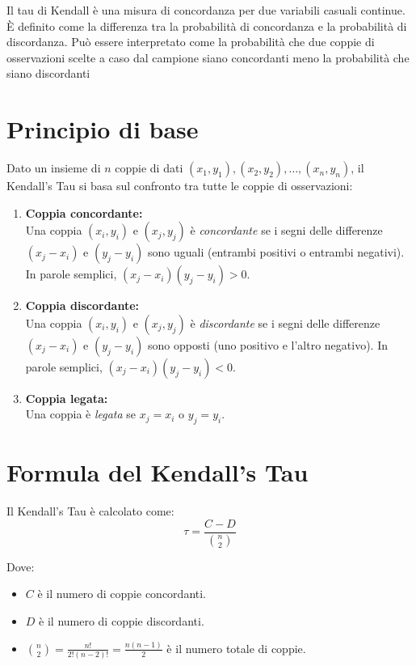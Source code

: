 \documentclass[a4paper,12pt]{article}
\begin{document}
\begin{itemize}
	Il tau di Kendall è una misura di concordanza per due variabili casuali continue. È definito come la differenza tra la probabilità di concordanza e la probabilità di discordanza. Può essere interpretato come la probabilità che due coppie di osservazioni scelte a caso dal campione siano concordanti meno la probabilità che siano discordanti
	\section*{Principio di base}
	
	Dato un insieme di \( n \) coppie di dati \((x_1, y_1), (x_2, y_2), \ldots, (x_n, y_n)\), il Kendall's Tau si basa sul confronto tra tutte le coppie di osservazioni:
	
	\begin{enumerate}[label=\arabic*.]
		\item \textbf{Coppia concordante:} \\
		Una coppia \((x_i, y_i)\) e \((x_j, y_j)\) è \textit{concordante} se i segni delle differenze \((x_j - x_i)\) e \((y_j - y_i)\) sono uguali (entrambi positivi o entrambi negativi). In parole semplici, $(x_j - x_i)(y_j - y_i)>0$.
		
		\item \textbf{Coppia discordante:} \\
		Una coppia \((x_i, y_i)\) e \((x_j, y_j)\) è \textit{discordante} se i segni delle differenze \((x_j - x_i)\) e \((y_j - y_i)\) sono opposti (uno positivo e l'altro negativo). In parole semplici, $(x_j - x_i)(y_j - y_i)<0$.
		
		\item \textbf{Coppia legata:} \\
		Una coppia è \textit{legata} se \(x_j = x_i\) o \(y_j = y_i\).
	\end{enumerate}
	
	\section*{Formula del Kendall's Tau}
	
	Il Kendall's Tau è calcolato come:
	\[
	\tau = \frac{C - D}{\binom{n}{2}}
	\]
	
	Dove:
	\begin{itemize}
		\item \(C\) è il numero di coppie concordanti.
		\item \(D\) è il numero di coppie discordanti.
		\item \(\binom{n}{2} =\frac{n!}{2!(n-2)!}= \frac{n(n-1)}{2}\) è il numero totale di coppie.
	\end{itemize}
	

\end{itemize}
\end{document}
